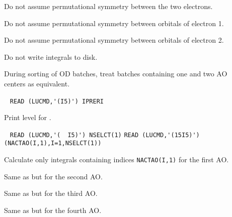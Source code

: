 \begin{description}
\item[] Do not assume permutational symmetry between the
two electrons.

\item[] Do not assume permutational symmetry between
orbitals of electron 1.

\item[] Do not assume permutational symmetry between
orbitals of electron 2.

\item[] Do not write integrals to disk.

\item[] During sorting of OD batches, treat batches
containing one and two AO centers as equivalent.

\item[]\verb| |\newline
\verb|READ (LUCMD,'(I5)') IPRERI|

Print level for {\eri}.

\item[]\verb| |\newline
\verb|READ (LUCMD,'(  I5)') NSELCT(1)|\newline
\verb|READ (LUCMD,'(15I5)') (NACTAO(I,1),I=1,NSELCT(1))|

Calculate only integrals containing indices \verb|NACTAO(I,1)| for the
first AO.

\item[] Same as  but for the second AO.

\item[] Same as  but for the third AO.

\item[] Same as  but for the fourth AO.
\end{description}
